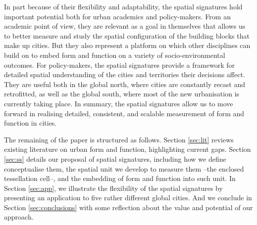 In part because of their flexibility and adaptability,
the spatial signatures hold important potential both for urban academics and
policy-makers.
From an academic point of view, they are relevant as a goal in themselves
that allows us to better measure and study the spatial configuration of the
building blocks that make up cities. But they also represent a platform on
which other disciplines can build on to embed form and function on a variety
of socio-environmental outcomes.
For policy-makers, the spatial signatures provide a framework for detailed
spatial understanding of the cities and territories their decisions affect.
They are useful both in the global
north, where cities are constantly recast and retrofitted, as well as the
global south, where most of the new urbanisation is currently taking place.
%
In summary, the spatial signatures allow us to move forward in realising
detailed, consistent, and scalable measurement of form and function in
cities.

The remaining of the paper is structured as follows. Section \ref{sec:lit}
reviews existing literature on urban form and function, highlighting current
gaps. Section \ref{sec:ss} details our proposal of spatial signatures,
including how we define conceptualise them, the spatial unit we develop to
measure them --the enclosed tessellation cell--, and the embedding of form and
function into such unit. In Section \ref{sec:app}, we illustrate the
flexibility of the spatial signatures by presenting an application to five
rather different global cities. And we conclude in Section
\ref{sec:conclusions} with some reflection about the value and potential of
our approach.








